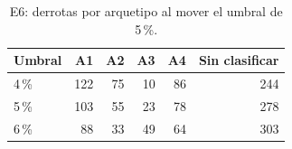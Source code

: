 \begin{table}[H]
\centering\small
\caption{E6: derrotas por arquetipo al mover el umbral de 5\,\%.}
\label{tab:sensibilidad}
\begin{tabular}{lrrrrr}
\toprule
Umbral & A1 & A2 & A3 & A4 & Sin clasificar \\
\midrule
4\,\% & 122 & 75 & 10 & 86 & 244 \\
5\,\% & 103 & 55 & 23 & 78 & 278 \\
6\,\% & 88 & 33 & 49 & 64 & 303 \\
\bottomrule
\end{tabular}
\end{table}
